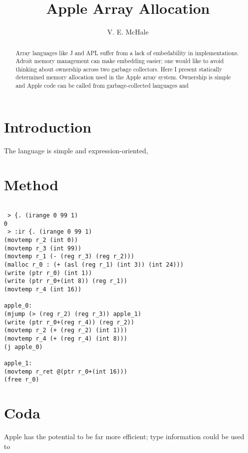 \documentclass{article}
\begin{document}
\title{Apple Array Allocation}
\author{V. E. McHale}
\maketitle

\begin{abstract}
    Array languages like J and APL suffer from a lack of embedability in implementations. Adroit memory management can make embedding easier; one would like to avoid thinking about ownership across two garbage collectors. Here I present statically determined memory allocation used in the Apple array system. Ownership is simple and Apple code can be called from garbage-collected languages and 
\end{abstract}

\section{Introduction}

The language is simple and expression-oriented,


\section{Method}


\begin{verbatim}

 > {. (irange 0 99 1)
0
 > :ir {. (irange 0 99 1)
(movtemp r_2 (int 0))
(movtemp r_3 (int 99))
(movtemp r_1 (- (reg r_3) (reg r_2)))
(malloc r_0 : (+ (asl (reg r_1) (int 3)) (int 24)))
(write (ptr r_0) (int 1))
(write (ptr r_0+(int 8)) (reg r_1))
(movtemp r_4 (int 16))

apple_0:
(mjump (> (reg r_2) (reg r_3)) apple_1)
(write (ptr r_0+(reg r_4)) (reg r_2))
(movtemp r_2 (+ (reg r_2) (int 1)))
(movtemp r_4 (+ (reg r_4) (int 8)))
(j apple_0)

apple_1:
(movtemp r_ret @(ptr r_0+(int 16)))
(free r_0)
\end{verbatim}

\section{Coda}

Apple has the potential to be far more efficient; type information could be used to
\end{document}
